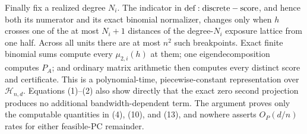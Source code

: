 Finally fix a realized degree \(N_i\).  The indicator in \({\rm def:discrete-score}\), and hence both its numerator and its exact binomial normalizer, changes only when \(h\) crosses one of the at most \(N_i+1\) distances of the degree-\(N_i\) exposure lattice from one half.  Across all units there are at most \(n^2\) such breakpoints.  Exact finite binomial sums compute every \(\mu_{2,i}(h)\) at them; one eigendecomposition computes \(P_A\); and ordinary matrix arithmetic then computes every distinct score and certificate.  This is a polynomial-time, piecewise-constant representation over \(\mathcal H_{n,d}\).  Equations (1)--(2) also show directly that the exact zero second projection produces no additional bandwidth-dependent term.  The argument proves only the computable quantities in (4), (10), and (13), and nowhere asserts \(O_P(d/n)\) rates for either feasible-PC remainder.